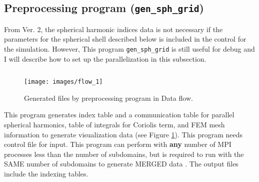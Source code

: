 \newpage
\subsection{Preprocessing program ({\tt gen\_sph\_grid})}
\label{section:gen_sph_grid}
%
From Ver. 2, the spherical harmonic indices data is not necessary if the parameters for the spherical shell described below is included in the control for the simulation. However, This program \verb|gen_sph_grid| is still useful for debug and I will describe how to set up the parallelization in this subsection.
%
\begin{verbatim}
\end{verbatim}
%
\begin{figure}[htbp]
\begin{center}
\texttt{[image: images/flow\_1]}
\end{center}
\caption{Generated files by preprocessing program in Data flow.}
\label{fig:gen_sph_grid}
\end{figure}
%
This program generates index table and a communication table for parallel spherical harmonics, table of integrals for Coriolis term, and FEM mesh information to generate visualization data (see Figure \ref{fig:gen_sph_grid}). This program needs control file for input. This program can perform with {\bf any} number of MPI processes less than the number of subdomains, but is required to run with the SAME number of subdomains to generate MERGED data . The output files include the indexing tables. 

